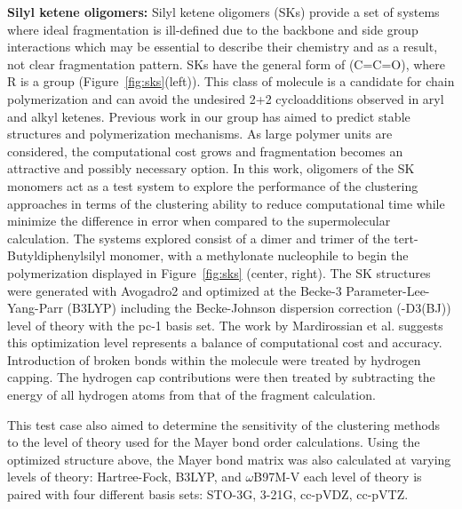 \noindent\textbf{Silyl ketene oligomers: } Silyl ketene oligomers (SKs) provide a set of systems where ideal fragmentation is ill-defined due to the backbone and side group interactions which may be essential to describe their chemistry and as a result, not clear fragmentation pattern.%
SKs have the general form of (C=C=O), where R is a  group (Figure~\ref{fig:sks}(left)).
This class of molecule is a candidate for chain polymerization and can avoid the undesired 2+2 cycloadditions observed in aryl and alkyl ketenes.
Previous work in our group has aimed to predict stable structures and polymerization mechanisms.\autocite{Xiang2017}
As large polymer units are considered, the computational cost grows and fragmentation becomes an attractive and possibly necessary option.
In this work, oligomers of the SK monomers act as a test system to explore the performance of the clustering approaches in terms of the clustering ability to reduce computational time while minimize the difference in error when compared to the supermolecular calculation.
The systems explored consist of a dimer and trimer of the tert-Butyldiphenylsilyl monomer, with a methylonate nucleophile to begin the polymerization displayed in Figure~\ref{fig:sks} (center, right). 
The SK structures were generated with Avogadro2 and optimized at the Becke-3 Parameter-Lee-Yang-Parr (B3LYP) including the Becke-Johnson dispersion correction (-D3(BJ)) level of theory with the pc-1 basis set.\autocite{B3,LYP,VWN,B3LYP_assembly}
The work by Mardirossian et al. suggests this optimization level represents a balance of computational cost and accuracy. \autocite{mardirossian_thirty_2017}
Introduction of broken bonds within the molecule were treated by hydrogen capping.
The hydrogen cap contributions were then treated by subtracting the energy of all hydrogen atoms from that of the fragment calculation. 

This test case also aimed to determine the sensitivity of the clustering methods to the level of theory used for the Mayer bond order calculations.
Using the optimized structure above, the Mayer bond matrix was also calculated at varying levels of theory: Hartree-Fock, B3LYP\autocite{B3,LYP,VWN, B3LYP_assembly}, and $\omega$B97M-V\autocite{mardirossian__2016} each level of theory is paired with four different basis sets: STO-3G\autocite{hehre1969a,hehre1970a}, 3-21G\autocite{lendening1995a,andzelm1984a}, cc-pVDZ, cc-pVTZ.\autocite{ccpva,ccpvb}

